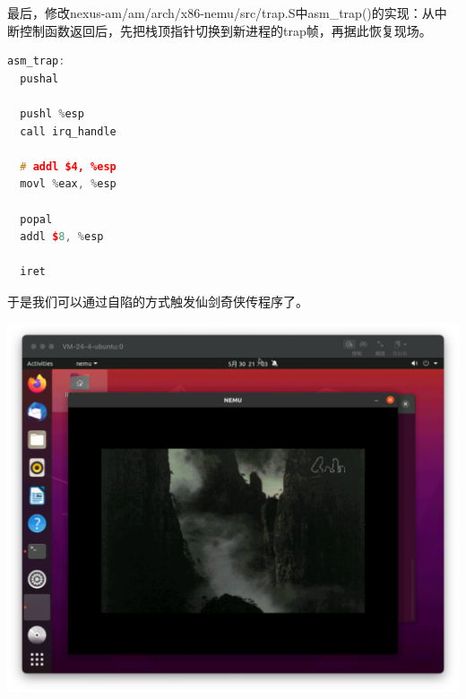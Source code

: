 \documentclass[UTF8,a4paper,10pt]{ctexart}
\begin{document}
最后，修改nexus-am/am/arch/x86-nemu/src/trap.S中asm\_trap()的实现：从中断控制函数返回后，先把栈顶指针切换到新进程的trap帧，再据此恢复现场。
\begin{lstlisting}[language=C++]
asm_trap:
  pushal

  pushl %esp
  call irq_handle

  # addl $4, %esp
  movl %eax, %esp

  popal
  addl $8, %esp

  iret
\end{lstlisting}
于是我们可以通过自陷的方式触发仙剑奇侠传程序了。
\begin{center}
  \includegraphics*[scale = 0.35]{img/10}
\end{center}
\end{document}
